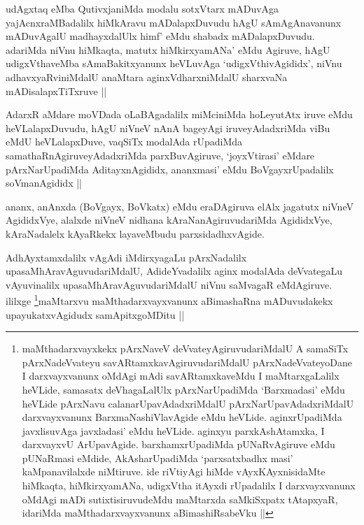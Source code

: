 \begin{artha}
udAgxtaq eMba QutivxjaniMda modalu sotxVtarx mADuvAga yajAcnxraMBadalilx hiMkAravu mADalapxDuvudu hAgU sAmAgAnavanunx mADuvAgalU madhayxdalUlx himf' eMdu shabadx mADalapxDuvudu. adariMda niVnu hiMkaqta, matutx hiMkirxyamANa' eMdu Agiruve, hAgU udigxVthaveMba sAmaBakitxyanunx heVLuvAga `udigxVthivAgididx', niVnu adhavxyaRviniMdalU anaMtara aginxVdharxniMdalU sharxvaNa mADisalapxTiTxruve ||
\end{artha}


AdarxR aMdare moVDada oLaBAgadalilx miMciniMda hoLeyutAtx iruve eMdu heVLalapxDuvudu, hAgU niVneV nAnA bageyAgi iruveyAdadxriMda viBu eMdU heVLalapxDuve, vaqSiTx modalAda rUpadiMda samathaRnAgiruveyAdadxriMda parxBuvAgiruve, `joyxVtirasi' eMdare pArxNarUpadiMda AditayxnAgididx, ananxmasi' eMdu BoVgayxrUpadalilx soVmanAgididx ||

\begin{artha}
ananx, anAnxda (BoVgayx, BoVkatx) eMdu eraDAgiruva elAlx jagatutx niVneV AgididxVye, alalxde niVneV nidhana kAraNanAgiruvudariMda AgididxVye, kAraNadalelx kAyaRkekx layaveMbudu parxsidadhxvAgide.
\end{artha}

\begin{artha}
  AdhAyxtamxdalilx vAgAdi iMdirxyagaLu pArxNadalilx upasaMhAravAguvudariMdalU, AdideYvadalilx aginx modalAda deVvategaLu vAyuvinalilx upasaMhAravAguvudariMdalU niVnu saMvagaR eMdAgiruve. ililxge \footnote{maMthadarxvayxkekx pArxNaveV deVvateyAgiruvudariMdalU A samaSiTx pArxNadeVvateyu savARtamxkavAgiruvudariMdalU pArxNadeVvateyoDane I darxvayxvanunx oMdAgi mAdi savARtamxkaveMdu I maMtarxgaLalilx heVLide, samasatx deVhagaLalUlx pArxNarUpadiMda `Barxmadasi' eMdu heVLide pArxNavu calanarUpavAdadxriMdalU pArxNarUpavAdadxriMdalU darxvayxvanunx BarxmaNashiVlavAgide eMdu heVLide. aginxrUpadiMda javxlisuvAga javxladasi' eMdu heVLide. aginxyu parxkAshAtamxka, I darxvayxvU ArUpavAgide. barxhamxrUpadiMda pUNaRvAgiruve eMdu pUNaRmasi eMdide, AkAsharUpadiMda `parxsatxbadhx masi' kaMpanavilalxde niMtiruve. ide riVtiyAgi hiMde vAyxKAyxnisidaMte hiMkaqta, hiMkirxyamANa, udigxVtha itAyxdi rUpadalilx I darxvayxvanunx oMdAgi mADi sutixtisiruvudeMdu maMtarxda saMkiSxpatx tAtapxyaR, idariMda maMthadarxvayxvanunx aBimashiRsabeVku ||}maMtarxvu maMthadarxvayxvanunx aBimashaRna mADuvudakekx upayukatxvAgidudx samApitxgoMDitu ||
\end{artha}

